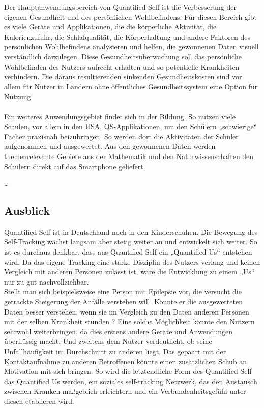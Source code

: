 Der Hauptanwendungsbereich von Quantified Self ist die Verbesserung der eigenen Gesundheit und des persönlichen Wohlbefindens. 
Für diesen Bereich gibt es viele Geräte und Applikationen, die die körperliche Aktivität, die Kalorienzufuhr, die Schlafqualität, die Körperhaltung und andere Faktoren des persönlichen Wohlbefindens analysieren und helfen, die gewonnenen Daten visuell verständlich darzulegen. 
Diese Gesundheitsüberwachung soll das persönliche Wohlbefinden des Nutzers aufrecht erhalten und so potentielle Krankheiten verhindern.
Die daraus resultierenden sinkenden Gesundheitskosten sind vor allem für Nutzer in Ländern ohne öffentliches Gesundheitssystem eine Option für Nutzung.
\\
\\
Ein weiteres Anwendungsgebiet findet sich in der Bildung. 
So nutzen viele Schulen, vor allem in den USA, QS-Applikationen, um den Schülern „schwierige“ Fächer praxisnah beizubringen. 
So werden dort die Aktivitäten der Schüler aufgenommen und ausgewertet.
Aus den gewonnenen Daten werden themenrelevante Gebiete aus der Mathematik und den Naturwissenschaften den Schülern direkt auf das Smartphone geliefert. 

\ldots 


\subsection{Ausblick}
\label{ch:Grundlagen:sec:QuantifiedSelf:subsec:Ausblick}

Quantified Self ist in Deutschland noch in den Kinderschuhen.
Die Bewegung des Self-Tracking wächst langsam aber stetig weiter an und entwickelt sich weiter.
So ist es durchaus denkbar, dass aus Quantified Self  ein „Quantified Us“ entstehen wird.
Da das eigene Tracking eine starke Disziplin des Nutzers verlang und keinen Vergleich mit anderen Personen zulässt ist, wäre die Entwicklung zu einem „Us“ nur zu gut nachvollziehbar.
\\
Stellt man sich beispielsweise eine Person mit Epilepsie vor, die versucht die getrackte Steigerung der Anfälle verstehen will. 
Könnte er die ausgewerteten Daten besser verstehen, wenn sie im Vergleich zu den Daten anderen Personen mit der selben Krankheit stünden ? 
Eine solche Möglichkeit könnte den Nutzern sehrwohl weiterbringen, da dies erstens andere Geräte und Anwendungen überflüssig macht. 
Und zweitens dem Nutzer verdeutlicht, ob seine Unfallhäufigkeit im Durchschnitt zu anderen liegt.
Das gepaart mit der Kontaktaufnahme zu anderen Betroffenen könnte einen zusätzlichen Schub an Motivation mit sich bringen. 
So wird die letztendliche Form des Quantified Self das Quantified Us werden, ein soziales self-tracking Netzwerk, das den Austausch zwischen Kranken maßgeblich erleichtern  und ein Verbundenheitsgefühl unter diesen etablieren wird.


